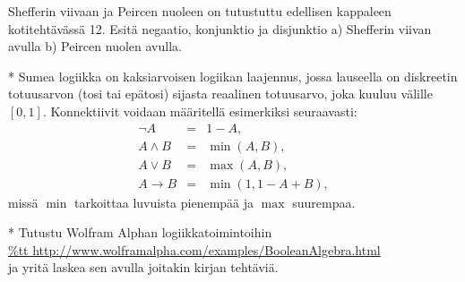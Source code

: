 \begin{kotitehtavasivu}
\begin{tehtava}
	Shefferin viivaan ja Peircen nuoleen on tutustuttu
	edellisen kappaleen kotitehtävässä 12. Esitä negaatio,
	konjunktio ja disjunktio a) Shefferin viivan avulla b)
	Peircen nuolen avulla.
\end{tehtava}

\begin{tehtava}
	* Sumea logiikka on kaksiarvoisen logiikan
	laajennus, jossa lauseella on diskreetin totuusarvon
	(tosi tai epätosi) sijasta reaalinen totuusarvo, joka
	kuuluu välille $[0, 1]$. Konnektiivit voidaan määritellä
	esimerkiksi seuraavasti:
	\[
	\begin{array}{rcl}
	\lnot A &=& 1-A,\\
	A\land B &=& \min(A, B),\\
	A\lor B &=& \max(A, B),\\
	A\to B
	&=& \min(1, 1-A+B),
	\end{array}
	\]
	missä $\min$ tarkoittaa luvuista pienempää ja $\max$
	suurempaa.

	\begin{alakohdat}
	\end{alakohdat}
\end{tehtava}

\begin{tehtava}
	* Tutustu Wolfram Alphan
	logiikkatoimintoihin\\
	\href{http://www.wolframalpha.com/examples/BooleanAlgebra.html}{{\%tt http://www.wolframalpha.com/examples/BooleanAlgebra.html}}\\
	ja yritä laskea sen avulla joitakin kirjan tehtäviä.
\end{tehtava}


\end{kotitehtavasivu}
